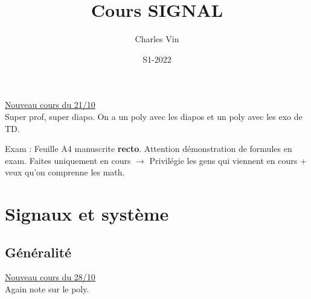 \documentclass{article}
\title{Cours SIGNAL}
\author{Charles Vin}
\date{S1-2022}
\theoremstyle{plain}%
\theoremstyle{definition}
\theoremstyle{remark}
\begin{document}
\maketitle

\underline{Nouveau cours du 21/10} \\

Super prof, super diapo. On a un poly avec les diapos et un poly avec les exo de TD.

Exam : Feuille A4 manuscrite \textbf{recto}. Attention démonstration de formules en exam. Faites uniquement en cours $\rightarrow$ Privilégie les gens qui viennent en cours + veux qu'on comprenne les math.

\section{Signaux et système}
\subsection{Généralité}

\underline{Nouveau cours du 28/10} \\
Again note sur le poly.
\end{document}
